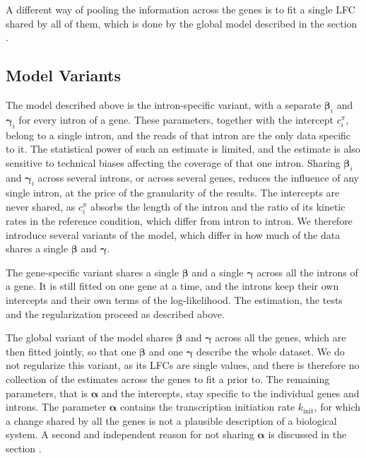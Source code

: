 \documentclass[11pt]{article}
\begin{document}
	A different way of pooling the information across the genes is to fit a single LFC shared by all of them, which is done by the global model described in the section .
		
	\subsection{Model Variants} \label{subsec:model_variants}	
	

	The model described above is the intron-specific variant, with a separate $\boldsymbol{\beta}_i$ and $\boldsymbol{\gamma}_i$ for every intron of a gene. These parameters, together with the intercept $c^{\pi}_{i}$, belong to a single intron, and the reads of that intron are the only data specific to it. The statistical power of such an estimate is limited, and the estimate is also sensitive to technical biases affecting the coverage of that one intron. Sharing $\boldsymbol{\beta}_i$ and $\boldsymbol{\gamma}_i$ across several introns, or across several genes, reduces the influence of any single intron, at the price of the granularity of the results. The intercepts are never shared, as $c^{\pi}_{i}$ absorbs the length of the intron and the ratio of its kinetic rates in the reference condition, which differ from intron to intron. We therefore introduce several variants of the model, which differ in how much of the data shares a single $\boldsymbol{\beta}$ and $\boldsymbol{\gamma}$.

	The gene-specific variant shares a single $\boldsymbol{\beta}$ and a single $\boldsymbol{\gamma}$ across all the introns of a gene. It is still fitted on one gene at a time, and the introns keep their own intercepts and their own terms of the log-likelihood. The estimation, the tests and the regularization proceed as described above.

	The global variant of the model shares $\boldsymbol{\beta}$ and $\boldsymbol{\gamma}$ across all the genes, which are then fitted jointly, so that one $\boldsymbol{\beta}$ and one $\boldsymbol{\gamma}$ describe the whole dataset. We do not regularize this variant, as its LFCs are single values, and there is therefore no collection of the estimates across the genes to fit a prior to. The remaining parameters, that is $\boldsymbol{\alpha}$ and the intercepts, stay specific to the individual genes and introns. The parameter $\boldsymbol{\alpha}$ contains the transcription initiation rate $k_{\mathrm{init}}$, for which a change shared by all the genes is not a plausible description of a biological system. A second and independent reason for not sharing $\boldsymbol{\alpha}$ is discussed in the section .
\end{document}
